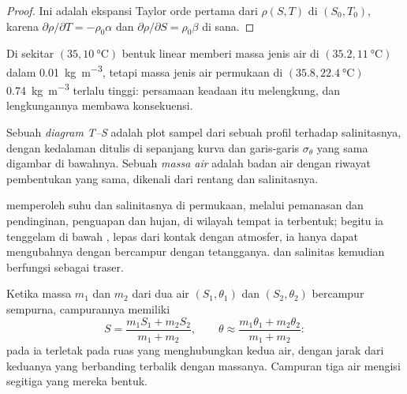 \begin{proof}
Ini adalah ekspansi Taylor orde pertama dari $\rho(S, T)$ di $(S_0, T_0)$, karena
$\partial\rho/\partial T = -\rho_0\alpha$ dan $\partial\rho/\partial S =
\rho_0\beta$ di sana.
\end{proof}

Di sekitar $(35, \qty{10}{\celsius})$ bentuk linear memberi massa jenis air di
$(35.2, \qty{11}{\celsius})$ dalam \qty{0.01}{kg.m^{-3}}, tetapi massa jenis air permukaan di
$(35.8, \qty{22.4}{\celsius})$ \qty{0.74}{kg.m^{-3}} terlalu tinggi: persamaan
keadaan itu melengkung, dan lengkungannya membawa konsekuensi.

\begin{definition}\label{def:b1:fluid-envelopes-structure:ts-diagram}
Sebuah \emph{diagram T--S} adalah plot  sampel dari
sebuah profil terhadap salinitasnya, dengan kedalaman ditulis di sepanjang kurva dan
garis-garis $\sigma_\theta$ yang sama digambar di bawahnya. Sebuah \emph{massa
air} adalah badan air dengan riwayat pembentukan yang sama, dikenali
dari rentang  dan salinitasnya.
\end{definition}

 memperoleh suhu dan salinitasnya di permukaan, melalui pemanasan dan
pendinginan, penguapan dan hujan, di wilayah tempat ia terbentuk; begitu ia tenggelam
di bawah , lepas dari kontak dengan atmosfer, ia hanya dapat
mengubahnya dengan bercampur dengan tetangganya.  dan salinitas
kemudian berfungsi sebagai traser.

\begin{proposition}\label{prop:b1:fluid-envelopes-structure:mixing}
Ketika massa $m_1$ dan $m_2$ dari dua air $(S_1, \theta_1)$ dan $(S_2, \theta_2)$
bercampur sempurna, campurannya memiliki
\[
  S = \frac{m_1 S_1 + m_2 S_2}{m_1 + m_2},\qquad
  \theta \approx \frac{m_1 \theta_1 + m_2 \theta_2}{m_1 + m_2}:
\]
pada  ia terletak pada ruas yang menghubungkan kedua air, dengan jarak
dari keduanya yang berbanding terbalik dengan massanya. Campuran tiga air mengisi
segitiga yang mereka bentuk.
\end{proposition}


